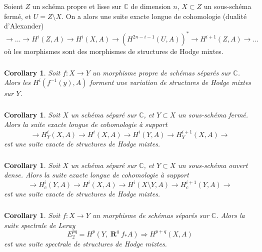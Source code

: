\documentclass[11pt]{amsart}
\theoremstyle{plain}
\newtheorem{corollary}[theorem]{Corollary}
\theoremstyle{definition}
\DeclareMathOperator{\Rd}{\mathbf{R}}
\newcommand{\CC}{\mathbb{C}}
\begin{document}
\subsubsection{}
Soient $Z$ un sch\'ema propre et lisse sur $\CC$ de dimension $n$, $X \subset Z$ un sous-sch\'ema ferm\'e, et $U = Z \setminus X$. On a alors une suite exacte longue de cohomologie (dualit\'e d'Alexander)
\[
\to \ldots \to H^i(Z, A) \to H^i(X, A) \to (H^{2n-i-1}(U, A))^* \to H^{i+1}(Z, A) \to \ldots
\]
o\`u les morphismes sont des morphismes de structures de Hodge mixtes.

\subsubsection{}
\begin{corollary}
Soit $f : X \to Y$ un morphisme propre de sch\'emas s\'epar\'es sur $\CC$. Alors les $H^i(f^{-1}(y), A)$ forment une variation de structures de Hodge mixtes sur $Y$.
\end{corollary}

\subsubsection{}
\begin{corollary}
Soit $X$ un sch\'ema s\'epar\'e sur $\CC$, et $Y \subset X$ un sous-sch\'ema ferm\'e. Alors la suite exacte longue de cohomologie \`a support
\[
\to H^i_Y(X, A) \to H^i(X, A) \to H^i(Y, A) \to H^{i+1}_Y(X, A) \to
\]
est une suite exacte de structures de Hodge mixtes.
\end{corollary}

\subsubsection{}
\begin{corollary}
Soit $X$ un sch\'ema s\'epar\'e sur $\CC$, et $Y \subset X$ un sous-sch\'ema ouvert dense. Alors la suite exacte longue de cohomologie \`a support
\[
\to H^i_c(Y, A) \to H^i(X, A) \to H^i(X \setminus Y, A) \to H^{i+1}_c(Y, A) \to
\]
est une suite exacte de structures de Hodge mixtes.
\end{corollary}

\subsubsection{}
\begin{corollary}
Soit $f : X \to Y$ un morphisme de sch\'emas s\'epar\'es sur $\CC$. Alors la suite spectrale de Leray
\[
E_2^{pq} = H^p(Y, \Rd^q f_* A) \Rightarrow H^{p+q}(X, A)
\]
est une suite spectrale de structures de Hodge mixtes.
\end{corollary}
\end{document}
